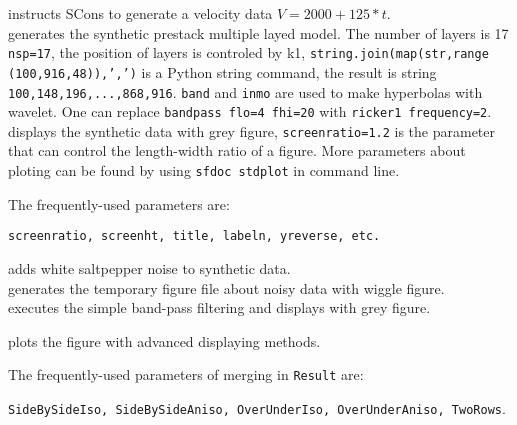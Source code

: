 
%
instructs SCons to generate a velocity data \texttt{$V=2000+125*t$}. \\


%
generates the synthetic prestack multiple layed model. The number of layers 
is 17 \texttt{nsp=17}, the position of layers is controled by k1, 
\texttt{string.join(map(str,range (100,916,48)),',')} is a Python string 
command, the result is string
\texttt{100,148,196,...,868,916}. \texttt{band} and
\texttt{inmo} are used to make hyperbolas with wavelet. One can replace 
\texttt{bandpass flo=4 fhi=20} with \texttt{ricker1 frequency=2}.\\


%
displays the synthetic data with grey figure, \texttt{screenratio=1.2} is 
the parameter that can control the length-width ratio of a figure. More
parameters about ploting can be found by using \texttt{sfdoc stdplot} in
command line.

The frequently-used parameters are:

\texttt{screenratio, screenht, title, labeln, yreverse, etc.}



%
adds white saltpepper noise to synthetic data. \\


%
generates the temporary figure file about noisy data with wiggle figure.\\


%
executes the simple band-pass filtering and displays with grey figure.\\



%
plots the figure with advanced displaying methods. 

The frequently-used parameters of merging in \texttt{Result} are:

\texttt{SideBySideIso, SideBySideAniso, OverUnderIso, OverUnderAniso, TwoRows}.

